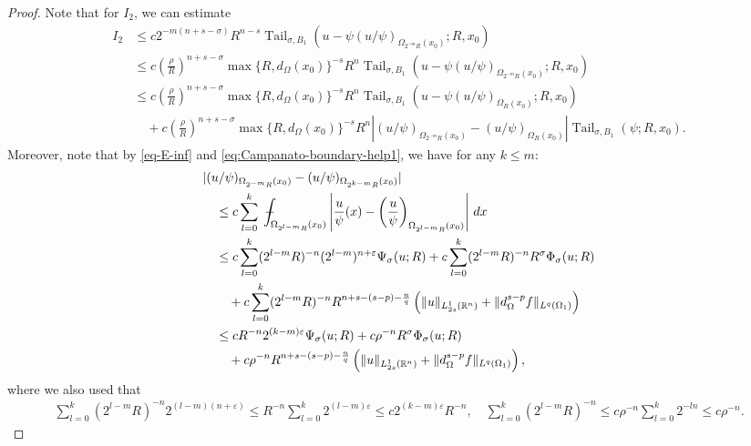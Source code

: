 \documentclass[11pt,reqno]{amsart}
\theoremstyle{plain}
\theoremstyle{definition}
\numberwithin{equation}{section}
\newcommand{\R}{\mathbb{R}}
\newcommand{\eps}{\varepsilon}
\newcommand{\1}{\mathbbm{1}}
\DeclareMathOperator{\tail}{Tail}
\renewcommand{\d}{\textnormal{\,d}}
\newcommand{\average}{{\mathchoice {\kern1ex\vcenter{\hrule height.4pt
width 6pt depth0pt} \kern-9.7pt} {\kern1ex\vcenter{\hrule
height.4pt width 4.3pt depth0pt} \kern-7pt} {} {} }}
\newcommand{\dashint}{\average\int}
\begin{document}
\begin{proof}
Note that for $I_2$, we can estimate
\begin{align*}
I_2 &\le c 2^{-m(n+s-\sigma)} R^{n-s} \tail_{\sigma,B_1}(u - \psi (u/\psi)_{\Omega_{2^{-m}R}(x_0)};R,x_0) \\
&\le c \left( \frac{\rho}{R} \right)^{n+s-\sigma} \max\{R,d_{\Omega}(x_0)\}^{-s} R^n \tail_{\sigma,B_1}(u - \psi (u/\psi)_{\Omega_{2^{-m}R}(x_0)};R,x_0) \\
&\le c \left( \frac{\rho}{R} \right)^{n+s - \sigma} \max\{R,d_{\Omega}(x_0)\}^{-s} R^n \tail_{\sigma,B_1}(u - \psi (u/\psi)_{\Omega_{R}(x_0)};R,x_0) \\
&\quad+  c \left( \frac{\rho}{R} \right)^{n+s-\sigma} \max\{R,d_{\Omega}(x_0)\}^{-s} R^n |(u/\psi)_{\Omega_{2^{-m}R}(x_0)} - (u/\psi)_{\Omega_{R}(x_0)}| \tail_{\sigma,B_1}(\psi;R,x_0).
\end{align*}
Moreover, note that by \eqref{eq-E-inf} and \eqref{eq:Campanato-boundary-help1}, we have for any $k \le m$:
\begin{align}
\label{eq:average-increment}
\begin{split}
& |(u/\psi)_{\Omega_{2^{-m}R}(x_0)} - (u/\psi)_{\Omega_{2^{k-m} R}(x_0)}| \\
&\quad \le c \sum_{l = 0}^{k} \dashint_{\Omega_{2^{l-m} R}(x_0)} \left| \frac{u}{\psi}(x) - \left( \frac{u}{\psi} \right)_{\Omega_{2^{l-m}R}(x_0)} \right| \d x \\
&\quad \le c \sum_{l = 0}^{k} (2^{l-m}R)^{-n} (2^{l-m})^{n+\varepsilon} \Psi_\sigma(u;R) + c \sum_{l = 0}^{k} (2^{l-m}R)^{-n} R^{\sigma} \Phi_\sigma(u; R) \\
& \quad \quad + c \sum_{l = 0}^{k} (2^{l-m}R)^{-n} R^{n + s-(s-p)-\frac{n}{q}} \left( \Vert u \Vert_{L^1_{2s}(\R^n)} + \Vert d_{\Omega}^{s-p} f \Vert_{L^q(\Omega_{1})} \right) \\
&\quad \le c R^{-n} 2^{(k-m)\eps} \Psi_\sigma(u;R) + c \rho^{-n} R^{\sigma} \Phi_{\sigma}(u; R) \\
&\quad\quad  + c \rho^{-n}R^{n + s-(s-p)-\frac{n}{q}} \left( \Vert u \Vert_{L^1_{2s}(\R^n)} + \Vert d_{\Omega}^{s-p} f \Vert_{L^q(\Omega_{1})} \right),
\end{split}
\end{align}
where we also used that
\begin{align*}
    \sum_{l = 0}^{k} (2^{l-m}R)^{-n} 2^{(l-m)(n + \varepsilon)} \le R^{-n} \sum_{l = 0}^{k} 2^{(l-m)\varepsilon} \le c 2^{(k-m)\eps} R^{-n}, \quad \sum_{l = 0}^{k} (2^{l-m}R)^{-n} \leq  c\rho^{-n} \sum_{l = 0}^k 2^{-ln} \le c \rho^{-n}.
\end{align*}


\end{proof}
\end{document}
